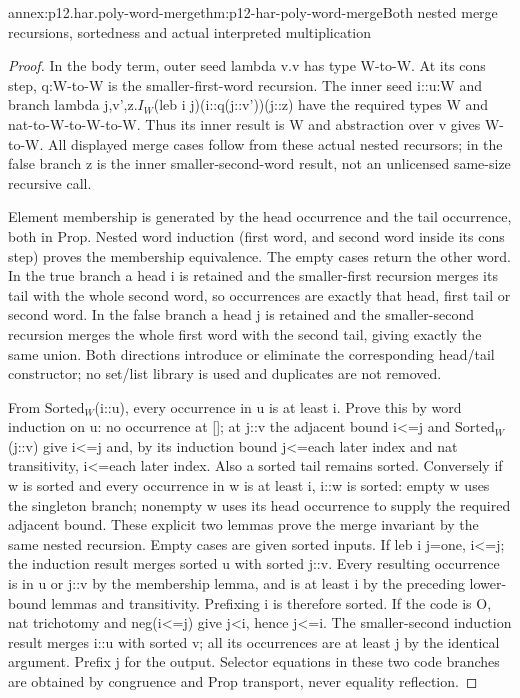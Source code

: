 \begin{annexitem}{annex:p12.har.poly-word-merge}{thm:p12-har-poly-word-merge}{Both nested merge recursions, sortedness and actual interpreted multiplication}
\begin{proof}
In the body term, outer seed lambda v.v has type W-to-W. At its
cons step, q:W-to-W is the smaller-first-word recursion. The inner
seed i::u:W and branch lambda j,v',z.\(I_W\)(leb i j)(i::q(j::v'))(j::z)
have the required types W and nat-to-W-to-W-to-W. Thus its inner
result is W and abstraction over v gives W-to-W. All displayed
merge cases follow from these actual nested recursors; in the false
branch z is the inner smaller-second-word result, not an unlicensed
same-size recursive call.

Element membership is generated by the head occurrence and the tail
occurrence, both in Prop. Nested word induction (first word, and
second word inside its cons step) proves the membership equivalence.
The empty cases return the other word. In the true branch a head i
is retained and the smaller-first recursion merges its tail with the
whole second word, so occurrences are exactly that head, first tail
or second word. In the false branch a head j is retained and the
smaller-second recursion merges the whole first word with the second
tail, giving exactly the same union. Both directions introduce or
eliminate the corresponding head/tail constructor; no set/list library
is used and duplicates are not removed.

From \(\mathrm{Sorted}_W\)(i::u), every occurrence in u is at least i. Prove this
by word induction on u: no occurrence at []; at j::v the adjacent
bound i<=j and \(\mathrm{Sorted}_W\)(j::v) give i<=j and, by its induction
bound j<=each later index and nat transitivity, i<=each later index.
Also a sorted tail remains sorted. Conversely if w is sorted and
every occurrence in w is at least i, i::w is sorted: empty w uses
the singleton branch; nonempty w uses its head occurrence to supply
the required adjacent bound. These explicit two lemmas prove the
merge invariant by the same nested recursion. Empty cases are given
sorted inputs. If leb i j=one, i<=j; the induction result merges
sorted u with sorted j::v. Every resulting occurrence is in u or
j::v by the membership lemma, and is at least i by the preceding
lower-bound lemmas and transitivity. Prefixing i is therefore sorted.
If the code is O, nat trichotomy and neg(i<=j) give j<i, hence
j<=i. The smaller-second induction result merges i::u with sorted v;
all its occurrences are at least j by the identical argument. Prefix
j for the output. Selector equations in these two code branches are
obtained by congruence and Prop transport, never equality reflection.


\end{proof}
\end{annexitem}
